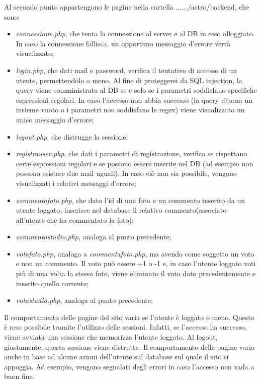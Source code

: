  Al secondo punto appartengono le pagine nella cartella ....../astro/backend, che sono:
 \begin{itemize}
 	\item \textit{connessione.php}, che tenta la connessione al server e al DB in esso alloggiato. In caso la connessione fallisca, un opportuno messaggio d'errore verrà visualizzato;
 	\item \textit{login.php}, che dati mail e password, verifica il tentativo di accesso di un utente, permettendolo o meno. Al fine di proteggersi da SQL injection, la query viene somministrata al DB se e solo se i parametri soddisfano specifiche espressioni regolari. In caso l'accesso non abbia successo (la query ritorna un insieme vuoto o i parametri non soddisfano le regex) viene visualizzato un unico messaggio d'errore;
 	\item \textit{logout.php}, che distrugge la sessione;
 	\item \textit{registrauser.php}, che dati i parametri di registrazione, verifica se rispettano certe espressioni regolari e se possono essere inserite nel DB (ad esempio non possono esistere due mail uguali). In caso ciò non sia possibile, vengono visualizzati i relativi messaggi d'errore;
 	\item \textit{commentafoto.php}, che dato l'id di una foto e un commento inserito da un utente loggato, inserisce nel database il relativo commento(associato all'utente che ha commentato la foto);
 	\item \textit{commentastudio.php}, analoga al punto precedente;
 	\item \textit{votafoto.php}, analoga a \textit{commentafoto.php}, ma avendo come soggetto un voto e non un commento. Il voto può essere +1 o -1 e, in caso l'utente loggato voti più di una volta la stessa foto, viene eliminato il voto dato precedentemente e inserito quello corrente;
 	\item \textit{votastudio.php}, analoga al punto precedente;
 \end{itemize}
 
Il comportamento delle pagine del sito varia se l'utente è loggato o meno. Questo è reso possibile tramite l'utilizzo delle sessioni. Infatti, se l'accesso ha successo, viene avviata una sessione che memorizza l'utente loggato. Al logout, giustamente, questa sessione viene distrutta. Il comportamento delle pagine varia anche in base ad alcune azioni dell'utente sul database sul quale il sito si appoggia. Ad esempio, vengono segnalati degli errori in caso l'accesso non vada a buon fine.

